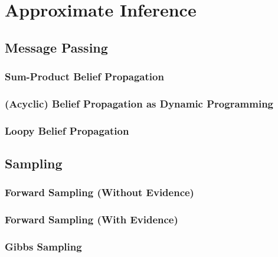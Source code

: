 \chapter{Approximate Inference} %
	\label{c:approxInference}


	\section{Message Passing} %

		\subsection{Sum-Product Belief Propagation} %

		\subsection{(Acyclic) Belief Propagation as Dynamic Programming} %

		\subsection{Loopy Belief Propagation} %

	\section{Sampling} %

		\subsection{Forward Sampling (Without Evidence)} %

		\subsection{Forward Sampling (With Evidence)} %

		\subsection{Gibbs Sampling} %

